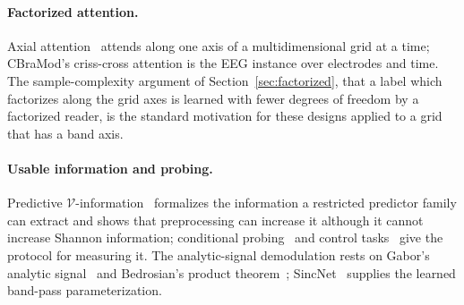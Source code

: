 \paragraph{Factorized attention.}
Axial attention~\cite{ho2019axial} attends along one axis of a multidimensional grid at a time; CBraMod's criss-cross attention is the EEG instance over electrodes and time. The sample-complexity argument of Section~\ref{sec:factorized}, that a label which factorizes along the grid axes is learned with fewer degrees of freedom by a factorized reader, is the standard motivation for these designs applied to a grid that has a band axis.

\paragraph{Usable information and probing.}
Predictive $\mathcal{V}$-information~\cite{xu2020usable} formalizes the information a restricted predictor family can extract and shows that preprocessing can increase it although it cannot increase Shannon information; conditional probing~\cite{hewitt2021conditional} and control tasks~\cite{hewitt2019control} give the protocol for measuring it. The analytic-signal demodulation rests on Gabor's analytic signal~\cite{gabor1946theory} and Bedrosian's product theorem~\cite{bedrosian1963product}; SincNet~\cite{ravanelli2018sincnet} supplies the learned band-pass parameterization.
